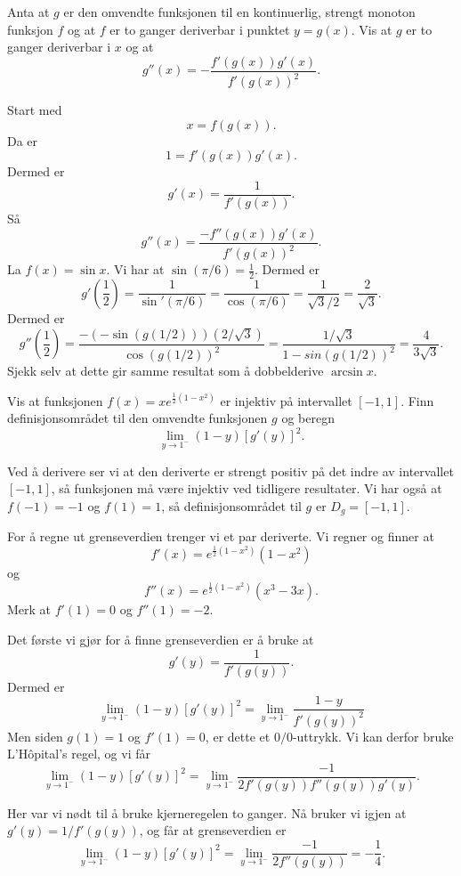 \documentclass[11pt, norsk]{article}
\begin{document}
\begin{oppg}[7.4.8]
Anta at $g$ er den omvendte funksjonen til en kontinuerlig, strengt monoton funksjon $f$ og at $f$ er to ganger deriverbar i punktet $y=g(x)$. Vis at $g$ er to ganger deriverbar i $x$ og at 
$$
g''(x) = -\frac{f'(g(x))g'(x)}{f'(g(x))^2}.
$$
\end{oppg}
\begin{losn}
Start med
$$
x=f(g(x)).
$$
Da er 
$$
1 = f'(g(x))g'(x).
$$
Dermed er
$$
g'(x) = \frac{1}{f'(g(x))}.
$$
Så 
$$
g''(x) = \frac{-f''(g(x))g'(x)}{f'(g(x))^2}.
$$
La $f(x)=\sin x$. Vi har at $\sin(\pi/6)=\frac 12$. Dermed er
$$
g'\left(\frac 12\right) = \frac{1}{\sin'(\pi/6)}=\frac{1}{\cos(\pi/6)}= \frac{1}{\sqrt{3}/2}=\frac{2}{\sqrt{3}}.
$$
Dermed er
$$
g''\left( \frac 12 \right) = \frac{-(-\sin(g(1/2)))(2/\sqrt{3})}{\cos(g(1/2))^2}=\frac{1/\sqrt{3}}{1-sin(g(1/2))^2}=\frac{4}{3\sqrt 3}.
$$
Sjekk selv at dette gir samme resultat som å dobbelderive $\arcsin x$.
\end{losn}

\begin{oppg}[7.4.10]
Vis at funksjonen $f(x)=xe^{\frac 12(1-x^2)}$ er injektiv på intervallet $[-1,1]$. Finn definisjonsområdet til den omvendte funksjonen $g$ og beregn
$$
\lim_{y \to 1^-} (1-y)[g'(y)]^2.
$$
\end{oppg}
\begin{losn}
Ved å derivere ser vi at den deriverte er strengt positiv på det indre av intervallet $[-1,1]$, så funksjonen må være injektiv ved tidligere resultater. Vi har også at $f(-1)=-1$ og $f(1)=1$, så definisjonsområdet til $g$ er $D_g=[-1,1]$. 

For å regne ut grenseverdien trenger vi et par deriverte. Vi regner og finner at
$$
f'(x) = e^{\frac 12 (1-x^2)}(1-x^2)
$$
og 
$$
f''(x) = e^{\frac 12 (1-x^2)}(x^3-3x).
$$
Merk at $f'(1)=0$ og $f''(1)=-2$.

Det første vi gjør for å finne grenseverdien er å bruke at
$$
g'(y) = \frac{1}{f'(g(y))}.
$$
Dermed er
$$
\lim_{y \to 1^-} (1-y)[g'(y)]^2 = \lim_{y \to 1^-} \frac{1-y}{f'(g(y))^2}
$$
Men siden $g(1)=1$ og $f'(1)=0$, er dette et $0/0$-uttrykk. Vi kan derfor bruke L'Hôpital's regel, og vi får
$$
\lim_{y \to 1^-} (1-y)[g'(y)]^2 = \lim_{y \to 1^-} \frac{-1}{2f'(g(y))f''(g(y))g'(y)}.
$$

Her var vi nødt til å bruke kjerneregelen to ganger. Nå bruker vi igjen at $g'(y)=1/f'(g(y))$, og får at grenseverdien er
$$
\lim_{y \to 1^-} (1-y)[g'(y)]^2 = \lim_{y \to 1^-} \frac{-1}{2f''(g(y))}=-\frac{1}{4}.
$$
\end{losn}
\end{document}
